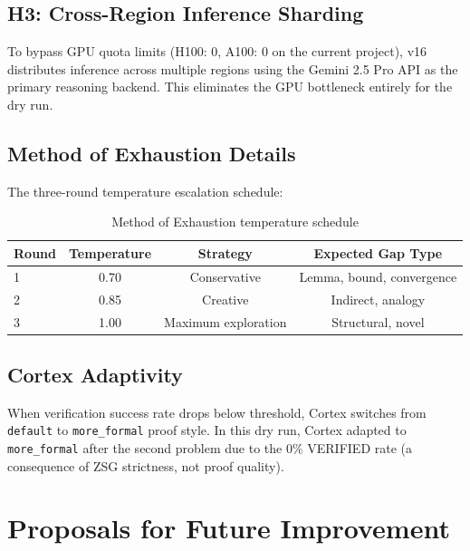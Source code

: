 \documentclass[12pt,a4paper]{report}
\theoremstyle{plain}
\theoremstyle{definition}
\theoremstyle{remark}
\begin{document}
\section{H3: Cross-Region Inference Sharding}

To bypass GPU quota limits (H100: 0, A100: 0 on the current project), v16
distributes inference across multiple regions using the Gemini 2.5 Pro API
as the primary reasoning backend. This eliminates the GPU bottleneck entirely
for the dry run.

\section{Method of Exhaustion Details}

The three-round temperature escalation schedule:

\begin{table}[h!]
\centering
\begin{tabular}{lccc}
\toprule
\textbf{Round} & \textbf{Temperature} & \textbf{Strategy} & \textbf{Expected Gap Type} \\
\midrule
1 & 0.70 & Conservative & Lemma, bound, convergence \\
2 & 0.85 & Creative & Indirect, analogy \\
3 & 1.00 & Maximum exploration & Structural, novel \\
\bottomrule
\end{tabular}
\caption{Method of Exhaustion temperature schedule}
\end{table}

\section{Cortex Adaptivity}

When verification success rate drops below threshold, Cortex switches from
\texttt{default} to \texttt{more\_formal} proof style. In this dry run,
Cortex adapted to \texttt{more\_formal} after the second problem due to
the 0\% VERIFIED rate (a consequence of ZSG strictness, not proof quality).

\chapter{Proposals for Future Improvement}
\label{app:future}
\end{document}
